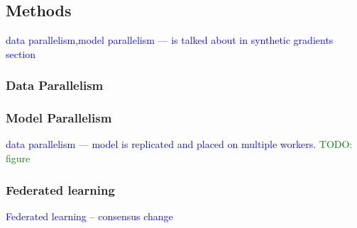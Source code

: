 \subsection{Methods}


\textcolor{blue}{data parallelism,model parallelism --- is talked about in synthetic gradients section}

\subsubsection{Data Parallelism}



\subsubsection{Model Parallelism}

\textcolor{blue}{data parallelism --- model is replicated and placed on multiple workers. \textcolor{green}{TODO: figure}}

\subsubsection{Federated learning}

\textcolor{blue}{Federated learning -- consensus change}